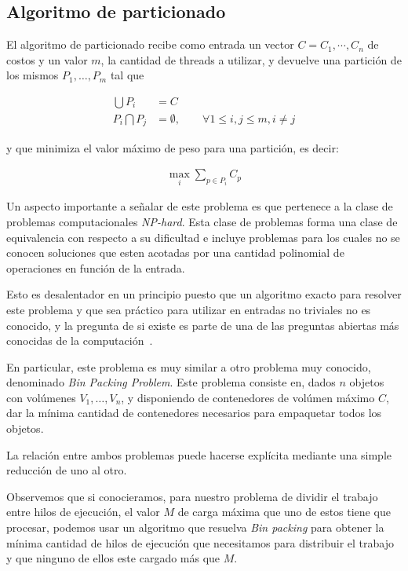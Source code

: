 \subsection{Algoritmo de particionado}

El algoritmo de particionado recibe como entrada un vector $C = {C_1, \cdots, C_n}$
de costos y un valor $m$, la cantidad de threads a utilizar, y devuelve una 
partici\'on de los mismos $P_1, \dots, P_m$ tal que

\begin{align}
    \bigcup P_i & = C \\
    P_i \bigcap P_j & = \emptyset, \qquad \forall 1 \leq i,j \leq m, i \neq j
    \label{eq:partition-conditions}
\end{align}

y que minimiza el valor m\'aximo de peso para una partici\'on, es decir:

\begin{align}
    \displaystyle \max_i \sum_{p \in P_i} C_p
\end{align}

Un aspecto importante a se\~nalar de este problema es que pertenece a la clase
de problemas computacionales \textit{NP-hard}. Esta clase de problemas forma una
clase de equivalencia con respecto a su dificultad e incluye problemas para los 
cuales no se conocen soluciones que esten acotadas por una cantidad polinomial 
de operaciones en funci\'on de la entrada.

Esto es desalentador en un principio puesto que un algoritmo exacto para resolver
este problema y que sea pr\'actico para utilizar en entradas no triviales no es
conocido, y la pregunta de si existe es parte de una de las preguntas abiertas
m\'as conocidas de la computaci\'on~\cite{Cormen}.

En particular, este problema es muy similar a otro problema muy conocido, 
denominado \textit{Bin Packing Problem}. Este problema consiste en, dados $n$ 
objetos con vol\'umenes $V_1, \dots, V_n$, y disponiendo de contenedores de
vol\'umen m\'aximo $C$, dar la m\'inima cantidad de contenedores necesarios para
empaquetar todos los objetos.

La relaci\'on entre ambos problemas puede hacerse expl\'icita mediante una simple
reducci\'on de uno al otro.

Observemos que si conocieramos, para nuestro problema de dividir el trabajo entre
hilos de ejecuci\'on, el valor $M$ de carga m\'axima que uno de estos tiene que
procesar, podemos usar un algoritmo que resuelva \textit{Bin packing} para 
obtener la m\'inima cantidad de hilos de ejecuci\'on que necesitamos para distribuir
el trabajo y que ninguno de ellos este cargado m\'as que $M$. 

